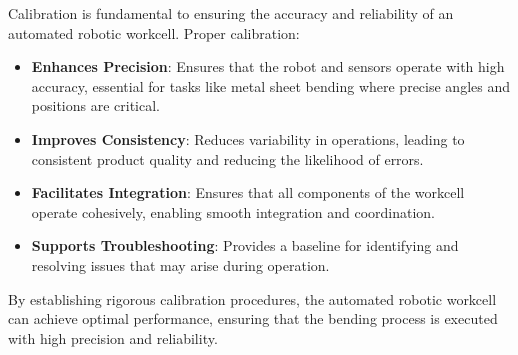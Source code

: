 Calibration is fundamental to ensuring the accuracy and reliability of an automated robotic workcell. Proper calibration:

\begin{itemize}
    \item \textbf{Enhances Precision}: Ensures that the robot and sensors operate with high accuracy, essential for tasks like metal sheet bending where precise angles and positions are critical.
    \item \textbf{Improves Consistency}: Reduces variability in operations, leading to consistent product quality and reducing the likelihood of errors.
    \item \textbf{Facilitates Integration}: Ensures that all components of the workcell operate cohesively, enabling smooth integration and coordination.
    \item \textbf{Supports Troubleshooting}: Provides a baseline for identifying and resolving issues that may arise during operation.
\end{itemize}

By establishing rigorous calibration procedures, the automated robotic workcell can achieve optimal performance, ensuring that the bending process is executed with high precision and reliability.
